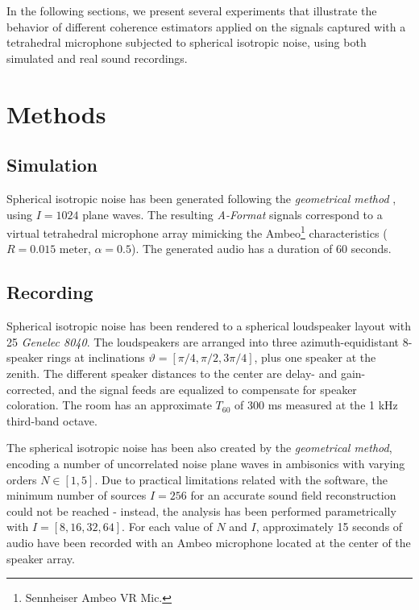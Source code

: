 In the following sections, we present several experiments that illustrate the behavior of different coherence estimators applied on the signals captured with a tetrahedral microphone subjected to spherical isotropic noise, using both simulated and real sound recordings.



\section{Methods}

\subsection{Simulation}
Spherical isotropic noise has been generated following the \textit{geometrical method} \cite{habets_generating_2007, habets_comments_2010}, using $I = 1024$ plane waves. The resulting \textit{A-Format} signals correspond to a virtual tetrahedral microphone array mimicking the Ambeo\footnote{Sennheiser Ambeo VR Mic. 
}
characteristics ($R=0.015$ meter, $\alpha=0.5$). 
The generated audio has a duration of 60 seconds. 





\subsection{Recording}

Spherical isotropic noise has been rendered to a spherical loudspeaker layout with 25 \textit{Genelec 8040}. The loudspeakers are arranged into three azimuth-equidistant 8-speaker rings at inclinations $\vartheta = [\pi/4, \pi/2, 3\pi/4]$, plus one speaker at the zenith.
The different speaker distances to the center are delay- and gain-corrected, and the signal feeds are equalized to compensate for speaker coloration. The room has an approximate $T_{60}$ of 300 ms measured at the 1 kHz third-band octave. 

The spherical isotropic noise has been also created by the \textit{geometrical method}, encoding a number of uncorrelated noise plane waves in ambisonics with varying orders $N \in [1,5]$. Due to practical limitations related with the software, the minimum number of sources $I = 256$ for an accurate sound field reconstruction \cite{habets_comments_2010} could not be reached - instead, the analysis has been performed parametrically with $I = [8, 16, 32, 64]$.
For each value of $N$ and $I$, approximately 15 seconds of audio have been recorded with an Ambeo microphone located at the center of the speaker array.

